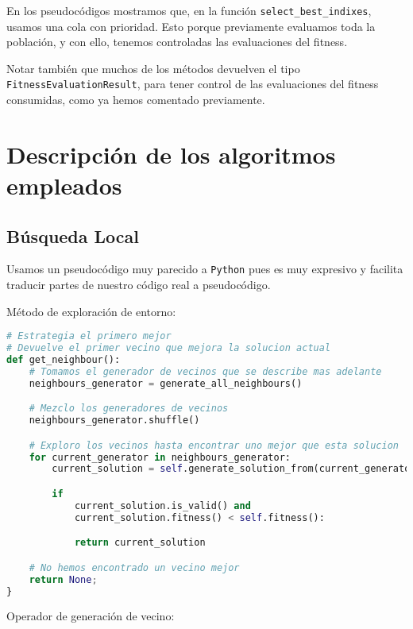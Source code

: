 \documentclass[11pt]{article}
\begin{document}
En los pseudocódigos mostramos que, en la función \lstinline{select_best_indixes}, usamos una cola con prioridad. Esto porque previamente evaluamos toda la población, y con ello, tenemos controladas las evaluaciones del fitness.

Notar también que muchos de los métodos devuelven el tipo \lstinline{FitnessEvaluationResult}, para tener control de las evaluaciones del fitness consumidas, como ya hemos comentado previamente.

\pagebreak

\section{Descripción de los algoritmos empleados}

\subsection{Búsqueda Local}

Usamos un pseudocódigo muy parecido a \lstinline{Python} pues es muy expresivo y facilita traducir partes de nuestro código real a pseudocódigo.

Método de exploración de entorno:

\begin{lstlisting}[language=Python, style=Boxed]
# Estrategia el primero mejor
# Devuelve el primer vecino que mejora la solucion actual
def get_neighbour():
    # Tomamos el generador de vecinos que se describe mas adelante
    neighbours_generator = generate_all_neighbours()

    # Mezclo los generadores de vecinos
    neighbours_generator.shuffle()

    # Exploro los vecinos hasta encontrar uno mejor que esta solucion
    for current_generator in neighbours_generator:
        current_solution = self.generate_solution_from(current_generator)

        if
            current_solution.is_valid() and
            current_solution.fitness() < self.fitness():

            return current_solution

    # No hemos encontrado un vecino mejor
    return None;
}
\end{lstlisting}

Operador de generación de vecino:
\end{document}
